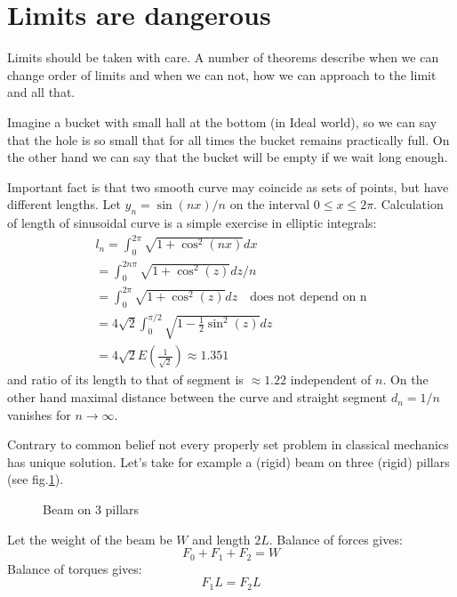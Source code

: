 \section{Limits are dangerous}
\label{limits}
Limits should be taken with care. A number of theorems describe 
when we can change order of limits and when we can not, how
we can approach to the limit and all that.

Imagine a bucket with small hall at the bottom (in Ideal world),
so we can say that the hole is so small that for all times the bucket remains practically full.
On the other hand we can say that the bucket will be empty if we wait long enough.

Important fact is that two smooth curve may coincide as sets of points, but have
different lengths. Let $ y_n= \sin(n x)/n $ on the  interval $ 0\le x \le 2 \pi $. 
Calculation of length of sinusoidal curve is a simple exercise in elliptic integrals:
\begin{equation}
   \label {sin-length}
   \begin{split}
       l_n=\int_0^{2 \pi}\sqrt{1+\cos^2(nx)}dx\\
       =\int_0^{2 n \pi}\sqrt{1+\cos^2(z)}dz/n\\
       =\int_0^{2 \pi}\sqrt{1+\cos^2(z)}dz\quad \text{does not depend on n}  \\
       =4 \sqrt{2} \int_0^{\pi/2}\sqrt{1-\frac{1}{2} \sin^2(z)}dz\\
       =4 \sqrt{2} E(\frac{1}{\sqrt{2}}) \approx 1.351
   \end{split}
\end{equation}  
and ratio of its length to that of segment is $ \approx 1.22 $ independent of $ n $.
On the other hand maximal distance between the curve and straight segment $ d_n=1/n $ 
vanishes for $ n\rightarrow \infty $.

Contrary to common belief not every properly set problem in
classical mechanics has unique solution. Let's take for example
a (rigid) beam on three (rigid) pillars (see fig.\ref{beam3}).
\begin{figure}[h]
\caption{Beam on 3 pillars}
\label {beam3}
\end{figure}
Let the weight of the beam be $W$ and length $2 L$.
Balance of forces gives:
\begin{equation}
        F_0+F_1+F_2=W \label {bf}
\end{equation}
Balance of torques gives:
\begin{equation}
        F_1 L=F_2 L \label {bt}
\end{equation}

